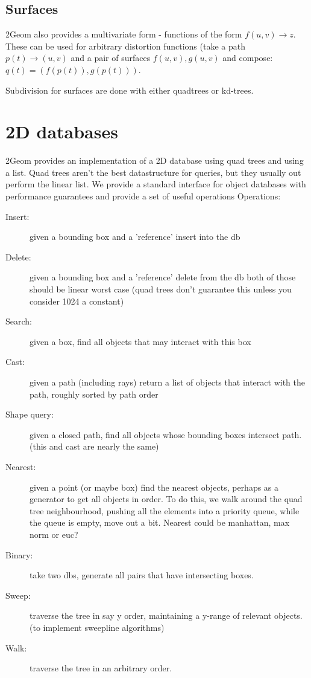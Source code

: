 \subsection{Surfaces}

2Geom also provides a multivariate form - functions of the form $f(u,v) \rightarrow z$.  These can be used for arbitrary distortion functions (take a path $p(t) \rightarrow (u,v)$ and a pair of surfaces $f(u,v),g(u,v)$ and compose: $q(t) = (f(p(t)), g(p(t)))$.

Subdivision for surfaces are done with either quadtrees or kd-trees.

\section{2D databases}

2Geom provides an implementation of a 2D database using quad trees and
using a list.  Quad trees aren't the best datastructure for queries,
but they usually out perform the linear list.  We provide a
standard interface for object databases with performance guarantees
and provide a set of useful operations Operations:

\begin{description}
\item[Insert:] given a bounding box and a 'reference' insert into the db

\item[Delete:] given a bounding box and a 'reference' delete from the db
both of those should be linear worst case
(quad trees don't guarantee this unless you consider 1024 a constant)

\item[Search:] given a box, find all objects that may interact with this box

\item[Cast:] given a path (including rays) return a list of objects that interact with the path, roughly sorted by path order

\item[Shape query:] given a closed path, find all objects whose bounding boxes intersect path.  (this and cast are nearly the same)

\item[Nearest:] given a point (or maybe box) find the nearest objects, perhaps as a generator to get all objects in order.  To do this, we walk around the quad tree neighbourhood, pushing all the elements into a priority queue, while the queue is empty, move out a bit.  Nearest could be manhattan, max norm or euc?

\item[Binary:] take two dbs, generate all pairs that have intersecting boxes.

\item[Sweep:] traverse the tree in say y order, maintaining a y-range of relevant objects. (to implement sweepline algorithms)

\item[Walk:] traverse the tree in an arbitrary order.

\end{description}


